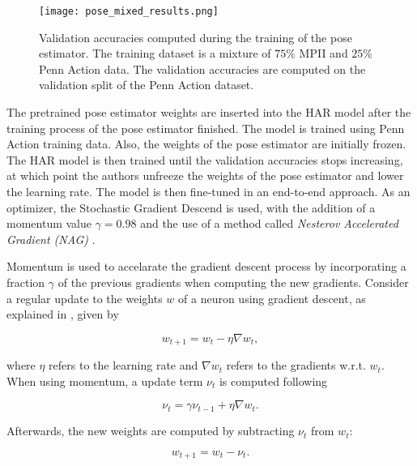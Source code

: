 \begin{figure}[htb!]
    \centering
    \texttt{[image: pose\_mixed\_results.png]}
    \caption{Validation accuracies computed during the training of the pose estimator. The training dataset is a mixture of $75\%$ MPII and $25\%$ Penn Action data. The validation accuracies are computed on the validation split of the Penn Action dataset. }
    \label{fig:pose_mixed_results}
\end{figure}

The pretrained pose estimator weights are inserted into the HAR model after the training process of the pose estimator finished.
The model is trained using Penn Action training data.
Also, the weights of the pose estimator are initially frozen.
The HAR model is then trained until the validation accuracies stops increasing, at which point the authors unfreeze the weights of the pose estimator and lower the learning rate.
The model is then fine-tuned in an end-to-end approach.
As an optimizer, the Stochastic Gradient Descend is used, with the addition of a momentum value $\gamma = 0.98$ and the use of a method called \textit{Nesterov Accelerated Gradient (NAG)} \cite{nesterov_method_1983}.

Momentum is used to accelarate the gradient descent process by incorporating a fraction $\gamma$ of the previous gradients when computing the new gradients.
Consider a regular update to the weights $w$ of a neuron using gradient descent, as explained in , given by

\begin{equation}
    w_{t+1} = w_t - \eta \nabla w_t,
\end{equation}

where $\eta$ refers to the learning rate and $\nabla w_t$ refers to the gradients w.r.t. $w_t$.
When using momentum, a update term $\nu_t$ is computed following

\begin{equation}
    \nu_t = \gamma \nu_{t-1} + \eta \nabla w_t.
\end{equation}

Afterwards, the new weights are computed by subtracting $\nu_t$ from $w_t$:

\begin{equation}
    w_{t+1} = w_t - \nu_t.
\end{equation}


